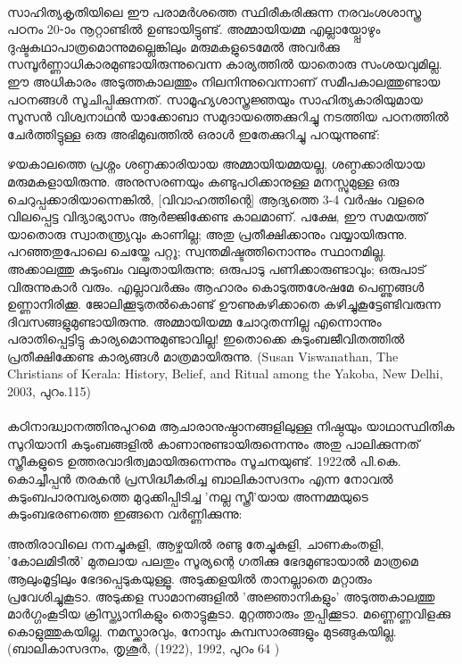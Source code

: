 \paragraph{}സാഹിത്യകൃതിയിലെ ഈ പരാമർശത്തെ സ്ഥിരീകരിക്കുന്ന നരവംശശാസ്ത്ര പഠനം 20-ാം നൂറ്റാണ്ടിൽ ഉണ്ടായിട്ടുണ്ട്. അമ്മായിയമ്മ എല്ലായ്പ്പോഴും ദുഷ്ടകഥാപാത്രമൊന്നുമല്ലെങ്കിലും മരുമകളുടെമേൽ അവർക്കു സമ്പൂർണ്ണാധികാരമുണ്ടായിരുന്നുവെന്ന കാര്യത്തിൽ യാതൊരു സംശയവുമില്ല. ഈ അധികാരം അടുത്തകാലത്തും നിലനിന്നുവെന്നാണ് സമീപകാലത്തുണ്ടായ പഠനങ്ങൾ സൂചിപ്പിക്കുന്നത്. സാമൂഹ്യശാസ്ത്രജ്ഞയും സാഹിത്യകാരിയുമായ സൂസൻ വിശ്വനാഥൻ യാക്കോബാ സമുദായത്തെക്കുറിച്ചു നടത്തിയ പഠനത്തിൽ ചേർത്തിട്ടുള്ള ഒരു അഭിമുഖത്തിൽ ഒരാൾ ഇതേക്കുറിച്ചു പറയുന്നുണ്ട്:
\begin{tcolorbox}{}
ഴയകാലത്തെ പ്രശ്നം ശണ്ഠക്കാരിയായ അമ്മായിയമ്മയല്ല, ശണ്ഠക്കാരിയായ മരുമകളായിരുന്നു. അനുസരണയും കണ്ടുപഠിക്കാനുള്ള മനസ്സുമുള്ള ഒരു ചെറുപ്പക്കാരിയാന്നെങ്കിൽ, [വിവാഹത്തിന്റെ] ആദ്യത്തെ 3-4 വർഷം വളരെ വിലപ്പെട്ട വിദ്യാഭ്യാസം ആർജ്ജിക്കേണ്ട കാലമാണ്. പക്ഷേ, ഈ സമയത്ത് യാതൊരു സ്വാതന്ത്ര്യവും കാണില്ല; അതു പ്രതീക്ഷിക്കാനും വയ്യായിരുന്നു. പറഞ്ഞതുപോലെ ചെയ്തേ പറ്റൂ; സ്വന്തമിഷ്ടത്തിനൊന്നും സ്ഥാനമില്ല. അക്കാലത്തു കുടുംബം വലുതായിരുന്നു; ഒരുപാടു പണിക്കാരുണ്ടാവും; ഒരുപാട് വിരുന്നുകാർ വരും. എല്ലാവർക്കും ആഹാരം കൊടുത്തശേഷമേ പെണ്ണുങ്ങൾ ഉണ്ണാനിരിക്കൂ. ജോലിക്കൂടുതൽകൊണ്ട് ഊണുകഴിക്കാതെ കഴിച്ചുകൂട്ടേണ്ടിവരുന്ന ദിവസങ്ങളുമുണ്ടായിരുന്നു. അമ്മായിയമ്മ ചോറുതന്നില്ല എന്നൊന്നും പരാതിപ്പെട്ടിട്ടു കാര്യമൊന്നുമുണ്ടാവില്ല! ഇതൊക്കെ കുടുംബജീവിതത്തിൽ പ്രതീക്ഷിക്കേണ്ട കാര്യങ്ങൾ മാത്രമായിരുന്നു.
(Susan Viswanathan, The Christians of Kerala: History, Belief, and Ritual among the Yakoba, New Delhi, 2003, പുറം.115)
\end{tcolorbox}
\paragraph{}കഠിനാദ്ധ്വാനത്തിനുപുറമെ ആചാരാനുഷ്ഠാനങ്ങളിലുള്ള നിഷ്ഠയും യാഥാസ്ഥിതിക സുറിയാനി കുടുംബങ്ങളിൽ കാണാനുണ്ടായിരുന്നെന്നും അതു പാലിക്കുന്നത് സ്ത്രീകളുടെ ഉത്തരവാദിത്വമായിരുന്നെന്നും സൂചനയുണ്ട്. 1922ൽ പി.കെ. കൊച്ചീപ്പൻ തരകൻ പ്രസിദ്ധീകരിച്ച ബാലികാസദനം എന്ന നോവൽ കുടുംബപാരമ്പര്യത്തെ മുറുക്കിപ്പിടിച്ച 'നല്ല സ്ത്രീ'യായ അന്നമ്മയുടെ കുടുംബഭരണത്തെ ഇങ്ങനെ വർണ്ണിക്കുന്നു:
\begin{tcolorbox}{}
അതിരാവിലെ നനച്ചുകുളി, ആഴ്ചയിൽ രണ്ടു തേച്ചുകുളി, ചാണകംതളി, 'കോലമിടീൽ' മുതലായ പലതും സൂര്യന്റെ ഗതിക്കു ഭേദമുണ്ടായാൽ മാത്രമെ ആലുംമൂട്ടിലും ഭേദപ്പെടുകയുള്ളൂ. അടുക്കളയിൽ താനല്ലാതെ മറ്റാരും പ്രവേശിച്ചുകൂടാ. അടുക്കള സാമാനങ്ങളിൽ 'അജ്ഞാനികളും' അടുത്തകാലത്തു മാർഗ്ഗംകൂടിയ ക്രിസ്ത്യാനികളും തൊട്ടുകൂടാ. മുറ്റത്താരും തുപ്പിക്കൂടാ. മണ്ണെണ്ണവിളക്കു കൊളുത്തുകയില്ല. നമസ്ക്കാരവും, നോമ്പും കുമ്പസാരങ്ങളും മുടങ്ങുകയില്ല.
(ബാലികാസദനം, തൃശൂർ, (1922), 1992, പുറം 64 )
\end{tcolorbox}
